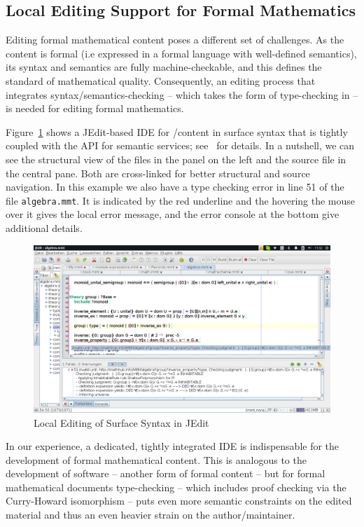 
\subsection{Local Editing Support for Formal Mathematics}\label{sec:local-formal}

Editing formal mathematical content poses a different set of challenges. As the content is
formal (i.e expressed in a formal language with well-defined semantics), its syntax and
semantics are fully machine-checkable, and this defines the standard of mathematical
quality. Consequently, an editing process that integrates syntax/semantics-checking --
which takes the form of type-checking in \mmt -- is needed for editing formal mathematics.

Figure~\ref{fig:jedit2} shows a JEdit-based IDE for \omdoc/\mmt content in \mmt surface
syntax that is tightly coupled with the \mmt API for semantic services;
see~\cite{Rabe:LII14} for details. In a nutshell, we can see the structural view of the
files in the panel on the left and the source file in the central pane. Both are
cross-linked for better structural and source navigation. In this example we also have a
type checking error in line 51 of the file \texttt{algebra.mmt}. It is indicated by the
red underline and the hovering the mouse over it gives the local error message, and the
error console at the bottom give additional details.

\begin{figure}[ht]\centering
  \includegraphics[width=\textwidth]{jedit2}
  \caption{Local Editing of \mmt Surface Syntax in JEdit}\label{fig:jedit2}
\end{figure}

In our experience, a dedicated, tightly integrated IDE is indispensable for the
development of formal mathematical content. This is analogous to the development of
software -- another form of formal content -- but for formal mathematical documents
type-checking -- which includes proof checking via the Curry-Howard isomorphism -- puts
even more semantic constraints on the edited material and thus an even heavier strain on
the author/maintainer.

